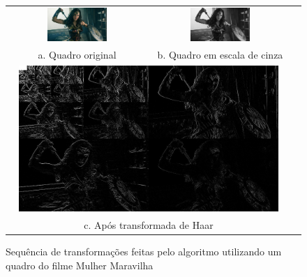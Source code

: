 \begin{figure}[h]
  \centering
  \begin{tabular}{ccc}
    \centering
    \includegraphics[width=0.45\textwidth]{dados/figuras/ww.jpg} & \includegraphics[width=0.45\textwidth]{dados/figuras/ww_bw.jpg} \\ 
     a. Quadro original & b. Quadro em escala de cinza \\
    \multicolumn{2}{c}{\includegraphics[width=0.94\textwidth]{dados/figuras/ww_haar_.jpg}} \\
    \multicolumn{2}{c}{c. Após transformada de Haar}
  \end{tabular}
  \caption{Sequência de transformações feitas pelo algoritmo utilizando um quadro do filme Mulher Maravilha}
  \label{figure:haar}
\end{figure}

